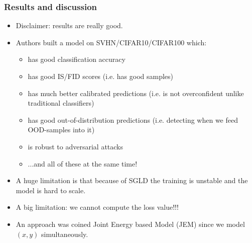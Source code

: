 \documentclass[10pt]{beamer}
\begin{document}
\begin{frame}
    \frametitle{Results and discussion}
    \begin{itemize}
        \item\pause Disclaimer: results are really good.
        \item\pause Authors built a model on SVHN/CIFAR10/CIFAR100 which:
        \begin{itemize}
            \item\pause has good classification accuracy
            \item\pause has good IS/FID scores (i.e. has good samples)
            \item\pause has much better calibrated predictions (i.e. is not overconfident unlike traditional classifiers)
            \item\pause has good out-of-distribution predictions (i.e. detecting when we feed OOD-samples into it)
            \item\pause is robust to adversarial attacks
            \item\pause ...and all of these at the same time!
        \end{itemize}
        \item\pause A huge limitation is that because of SGLD the training is unstable and the model is hard to scale.
        \item\pause A big limitation: we cannot compute the loss value!!!
        \item\pause An approach was coined Joint Energy based Model (JEM) since we model $(x,y)$ simultaneously.
    \end{itemize}
\end{frame}
\end{document}

